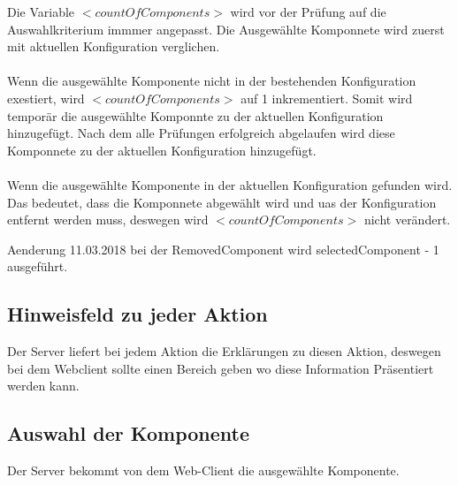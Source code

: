 \documentclass{article}
\begin{document}
\noindent Die Variable $<countOfComponents>$ wird vor der Prüfung auf die
Auswahlkriterium immmer angepasst. Die Ausgew\"ahlte Komponnete wird zuerst mit aktuellen
Konfiguration verglichen. \\\\
Wenn die ausgew\"ahlte Komponente nicht in der
bestehenden Konfiguration exestiert, wird $<countOfComponents>$ auf 1
inkrementiert. Somit wird tempor\"ar die ausgewählte Komponnte zu der aktuellen
Konfiguration hinzugefügt. Nach dem alle Pr\"ufungen erfolgreich abgelaufen wird
diese Komponnete zu der aktuellen Konfiguration hinzugefügt.\\\\
Wenn die ausgew\"ahlte Komponente in der aktuellen Konfiguration gefunden wird.
Das bedeutet, dass die Komponnete abgew\"ahlt wird und uas der Konfiguration
entfernt werden muss, deswegen wird $<countOfComponents>$ nicht ver\"andert.

Aenderung 11.03.2018 bei der RemovedComponent wird selectedComponent - 1
ausgeführt.

\subsection{Hinweisfeld zu jeder Aktion}
Der Server liefert bei jedem Aktion die Erklärungen zu diesen Aktion, deswegen
bei dem Webclient sollte einen Bereich geben wo diese Information Präsentiert
werden kann.

\subsection{Auswahl der Komponente}

Der Server bekommt von dem Web-Client die ausgew\"ahlte Komponente.
\end{document}
